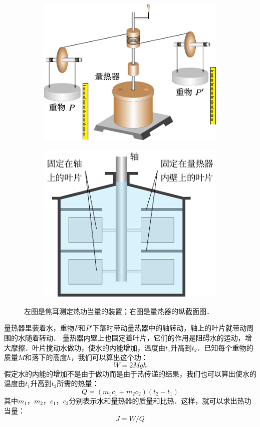 \begin{figure}[htbp]
    \centering
    \begin{subfigure}{0.4\linewidth}
        \centering
        \includegraphics{fig/B/2-2a.pdf}
        \caption{}\label{fig_B_2-2a}
    \end{subfigure}
    \hfill
    \begin{subfigure}{0.4\linewidth}
        \centering
        \includegraphics{fig/B/2-2b.pdf}
        \caption{}\label{fig_B_2-2b}
    \end{subfigure}
    \caption{左图是焦耳测定热功当量的装置；右图是量热器的纵截面图．}\label{fig_B_2-2}
\end{figure}


量热器里装着水，重物$P$和$P'$下落时带动量热器中的轴转动，轴上的叶片就带动周围的水随着转动．
量热器内壁上也固定着叶片，它们的作用是阻碍水的运动，增大摩擦．叶片搅动水做功，使水的内能增加，温度由$t_1$升高到$t_2$．已知每个重物的质量$M$和落下的高度$h$，我们可以算出这个功：
$$W=2Mgh $$
假定水的内能的增加不是由于做功而是由于热传递的结果，我们也可以算出使水的温度由$t_1$升高到$t_2$所需的热量：
\[Q=(m_1c_1+m_2c_2)(t_2-t_1)\]
其中$m_1$，$m_2$，$c_1$，$c_2$分别表示水和量热器的质量和比热．这样，就可以求出热功当量：
\[J=W/Q\]

